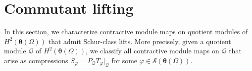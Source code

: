 \documentclass[12pt,reqno]{amsart}
\theoremstyle{remark}
\theoremstyle{definition}
\def \z{\boldsymbol{z}}
\def \\theta{\boldsymbol{\theta}}
\def \\xi{\boldsymbol{\xi}}
\begin{document}






\section{Commutant lifting}\label{S3}
In this section, we characterize contractive module maps on quotient modules of \(H^2(\boldsymbol \theta(\Omega))\) that admit Schur-class lifts. 
More precisely, given a quotient module $\mathcal Q$ of $H^2(\boldsymbol \theta(\Omega))$, we classify all contractive module maps on $\mathcal Q$ that arise as compressions $S_{\varphi}=P_{\mathcal{Q}}T_{\varphi}|_{\mathcal{Q}}$ for some $\varphi\in \mathcal S(\boldsymbol \theta(\Omega))$.
\end{document}
